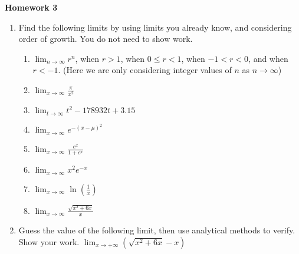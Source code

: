 \documentclass{article}
\begin{document}
\begin{center}
    \large \textbf{Homework 3}
\end{center}

                \begin{enumerate}

    	\item Find the following limits by using limits you already know, and considering order of growth. You do not need to show work.
    	    \begin{enumerate}
    	        \item $\displaystyle \lim_{n \rightarrow \infty} r^n$, when $r > 1$, when $0\leq r<1$, when $-1 < r < 0$, and when $r < -1$. (Here we are only considering integer values of $n$ as $n\to \infty$)
    	        \item $\displaystyle \lim_{x\rightarrow \infty} \frac{\pi}{x^2}$
    	        \item $\displaystyle \lim_{t\rightarrow \infty} t^2-178932t+3.15$
    	        \item $\displaystyle \lim_{x\rightarrow \infty} e^{-(x-\mu)^2}$
    	        \item $\displaystyle \lim_{x\rightarrow \infty} \frac{e^x}{1+e^x}$
    	        \item $\displaystyle \lim_{x\rightarrow \infty} x^2e^{-x}$
    	        \item $\displaystyle \lim_{x\rightarrow \infty} \ln \left(\frac{1}{x}\right)$ 
    	        \item $\displaystyle \lim_{x\rightarrow \infty} \frac{\sqrt{x^2+6x}}{x}$
    	    \end{enumerate}
    	     \item Guess the value of the following limit, then use analytical methods to verify. Show your work. $\displaystyle \lim_{x \rightarrow +\infty} (\sqrt{x^2+6x}-x)$ 
        	




\end{enumerate}
\end{document}
